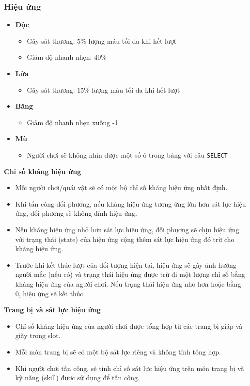 \subsubsection{Hiệu ứng}
\begin{itemize}
	\item \textbf{Độc}
	\begin{itemize}
		\item Gây sát thương: 5\% lượng máu tối đa khi hết lượt
		\item Giảm độ nhanh nhẹn: 40\%
	\end{itemize}
	\item \textbf{Lửa}
	\begin{itemize}
		\item Gây sát thương: 15\% lượng máu tối đa khi hết lượt
	\end{itemize}
	\item \textbf{Băng}
	\begin{itemize}
		\item Giảm độ nhanh nhẹn xuống -1
	\end{itemize}
	\item \textbf{Mù}
	\begin{itemize}
		\item Người chơi sẽ không nhìn được một số ô trong bảng với câu \texttt{SELECT}
	\end{itemize}
\end{itemize}
\textbf{Chỉ số kháng hiệu ứng}
\begin{itemize}
	\item Mỗi người chơi/quái vật sẽ có một bộ chỉ số kháng hiệu ứng nhất định.
	\item Khi tấn công đối phương, nếu kháng hiệu ứng tương ứng lớn hơn sát lực hiệu ứng, đối phương sẽ không dính hiệu ứng.
	\item Nếu kháng hiệu ứng nhỏ hơn sát lực hiệu ứng, đối phương sẽ chịu hiệu ứng với trạng thái (state) của hiệu ứng cộng thêm sát lực hiệu ứng đó trừ cho kháng hiệu ứng.
	\item Trước khi kết thúc lượt của đối tượng hiện tại, hiệu ứng sẽ gây ảnh hưởng người mắc (nếu có) và trạng thái hiệu ứng được trừ đi một lượng chỉ số bằng kháng hiệu ứng của người chơi. Nếu trạng thái hiệu ứng nhỏ hơn hoặc bằng 0, hiệu ứng sẽ kết thúc.
\end{itemize}
\textbf{Trang bị và sát lực hiệu ứng}
\begin{itemize}
	\item Chỉ số kháng hiệu ứng của người chơi được tổng hợp từ các trang bị giáp và giày trong slot.
	\item Mỗi món trang bị sẽ có một bộ sát lực riêng và không tính tổng hợp.
	\item Khi người chơi tấn công, sẽ tính chỉ số sát lực hiệu ứng trên món trang bị và kỹ năng (skill) được sử dụng để tấn công.
\end{itemize}

